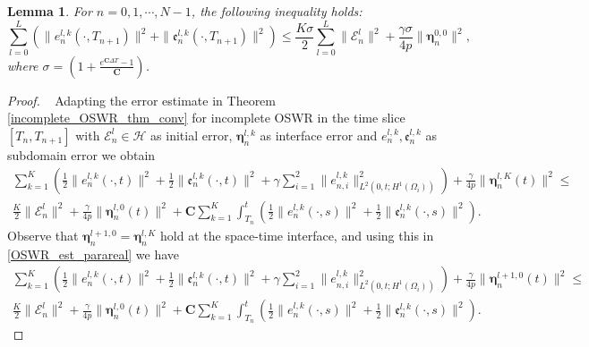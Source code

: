 \documentclass[11pt]{article}
\newtheorem{lemma}[theorem]{Lemma}
\begin{document}
\begin{lemma}\label{PA_lemma2}
For $n=0,1, \cdots, N-1$, the following inequality holds:
\begin{equation}\label{PA_err0}
\sum_{l=0}^L \left( \parallel e_n^{l,k}(\cdot, T_{n+1}) \parallel^2 + \parallel \mathfrak{e}_n^{l,k}(\cdot, T_{n+1}) \parallel^2 \right) \leq \frac{K\sigma}{2} \sum_{l=0}^L \parallel \mathcal{E}_{n}^{l}\parallel^2  +\frac{\gamma\sigma}{4p} \parallel\boldsymbol{\eta}_n^{0,0}\parallel^2,
\end{equation}
where $\sigma=\left( 1+\frac{e^{\boldsymbol{C} \Delta T}-1}{\boldsymbol{C}} \right)$.
\end{lemma}
\begin{proof}~
Adapting the error estimate in Theorem \ref{incomplete_OSWR_thm_conv} for incomplete OSWR in the time slice $[T_{n}, T_{n+1}]$ with $\mathcal{E}_{n}^{l}\in\mathcal{H}$ as initial error, $\boldsymbol{\eta}_n^{l,k}$ as interface error and ${e}_n^{l,k}, \mathfrak{e}_n^{l,k}$ as subdomain error we obtain
\begin{multline}\label{OSWR_est_parareal}
 \sum_{k=1}^K  \left( \frac{1}{2}\parallel {e}_n^{l,k}(\cdot,t)\parallel^2 + \frac{1}{2}\parallel \mathfrak{e}_n^{l,k}(\cdot, t)\parallel^2 +\gamma\sum_{i=1}^2 \parallel {e}_{n,i}^{l,k}\parallel_{L^2(0,t;H^1(\Omega_i))}^2\right) +\frac{\gamma}{4p} \parallel\boldsymbol{\eta}_n^{l,K}(t)\parallel^2 \leq \\ \frac{K}{2} \parallel \mathcal{E}_{n}^{l}\parallel^2  +\frac{\gamma}{4p} \parallel\boldsymbol{\eta}_n^{l,0}(t)\parallel^2 + \boldsymbol{C}\sum_{k=1}^K\int_{T_{n}}^t \left( \frac{1}{2}\parallel {e}_n^{l, k}(\cdot,s)\parallel^2 + \frac{1}{2}\parallel \mathfrak{e}_n^{l,k}(\cdot, s)\parallel^2 \right).
\end{multline}
Observe that $\boldsymbol{\eta}_n^{l+1,0}= \boldsymbol{\eta}_n^{l,K}$ hold at the space-time interface, and using this in \eqref{OSWR_est_parareal} we have  
\begin{multline}\label{OSWR_est_parareal2}
 \sum_{k=1}^K  \left( \frac{1}{2}\parallel {e}_n^{l,k}(\cdot,t)\parallel^2 + \frac{1}{2}\parallel \mathfrak{e}_n^{l,k}(\cdot, t)\parallel^2 +\gamma\sum_{i=1}^2 \parallel {e}_{n,i}^{l,k}\parallel_{L^2(0,t;H^1(\Omega_i))}^2\right) +\frac{\gamma}{4p} \parallel\boldsymbol{\eta}_n^{l+1,0}(t)\parallel^2 \leq \\ \frac{K}{2} \parallel \mathcal{E}_{n}^{l}\parallel^2  +\frac{\gamma}{4p} \parallel\boldsymbol{\eta}_n^{l,0}(t)\parallel^2 + \boldsymbol{C}\sum_{k=1}^K\int_{T_{n}}^t \left( \frac{1}{2}\parallel {e}_n^{l, k}(\cdot,s)\parallel^2 + \frac{1}{2}\parallel \mathfrak{e}_n^{l,k}(\cdot, s)\parallel^2 \right).

\end{multline}
\end{proof}
\end{document}
